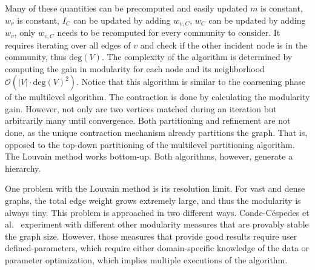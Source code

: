                 Many of these quantities can be precomputed and easily updated
                $m$ is constant, $w_v$ is constant, $I_C$ can be updated by adding $w_{v, C}$, $w_C$ can be updated by adding $w_v$, only $w_{v, C}$ needs to be recomputed for every community to consider. 
                It requires iterating over all edges of $v$ and check if the other incident node is in the community, thus $\text{deg}(V)$.
                The complexity of the algorithm is determined by computing the gain in modularity for each node and its neighborhood
                $\mathcal{O}(|V| \cdot \text{deg}(V)^2)$.
                Notice that this algorithm is similar to the coarsening phase of the multilevel algorithm.
                The contraction is done by calculating the modularity gain.
                However, not only are two vertices matched during an iteration but arbitrarily many until convergence. 
                Both partitioning and refinement are not done, as the unique contraction mechanism already partitions the graph.
                That is, opposed to the top-down partitioning of the multilevel partitioning algorithm. The Louvain method works bottom-up.
                Both algorithms, however, generate a hierarchy.
                
                One problem with the Louvain method is its resolution limit.
                For vast and dense graphs, the total edge weight grows extremely large, and thus the modularity is always tiny.
                This problem is approached in two different ways.
                Conde-C{\'e}spedes et al.~\autocite{conde2017comparison} experiment with different other modularity measures that are provably stable the graph size.
               However, those measures that provide good results require user defined-parameters, which require either domain-specific knowledge of the data or parameter optimization, which implies multiple executions of the algorithm.  
                


 
